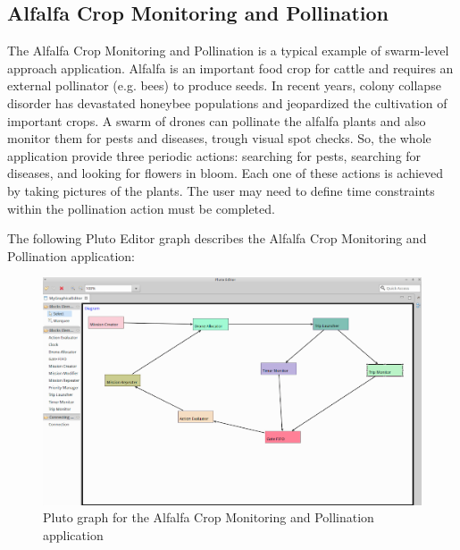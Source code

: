 \subsection{Alfalfa Crop Monitoring and Pollination}\label{alfalfa}

The Alfalfa Crop Monitoring and Pollination\cite{alfalfa} is a typical example of swarm-level approach application.
Alfalfa is an important food crop for cattle and requires an external pollinator (e.g. bees) to produce seeds. In recent years, colony collapse disorder has devastated honeybee populations and jeopardized the cultivation of important crops.
A swarm of drones can pollinate the alfalfa plants and also monitor them for pests and diseases, trough visual spot checks.
So, the whole application provide three periodic actions: searching for pests, searching for diseases, and looking for flowers in bloom.
Each one of these actions is achieved by taking pictures of the plants.
The user may need to define time constraints within the pollination  action must be completed.

The following Pluto Editor graph describes the Alfalfa Crop Monitoring and Pollination\cite{alfalfa} application:

\begin{figure}[H]
  \centering
  \includegraphics[width=\linewidth]{pictures/alfalfaEditor.png}
  \caption{Pluto graph for the Alfalfa Crop Monitoring and Pollination application}
  \label{fig:alfalfaGraph}
\end{figure}


